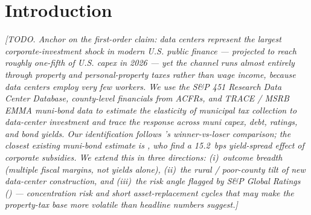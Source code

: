 \section{Introduction}\label{sec:intro}

\noindent\textit{[TODO. Anchor on the first-order claim: data centers represent the largest corporate-investment shock in modern U.S. public finance — projected to reach roughly one-fifth of U.S. capex in 2026 — yet the channel runs almost entirely through property and personal-property taxes rather than wage income, because data centers employ very few workers. We use the S\&P 451 Research Data Center Database, county-level financials from ACFRs, and TRACE / MSRB EMMA muni-bond data to estimate the elasticity of municipal tax collection to data-center investment and trace the response across muni capex, debt, ratings, and bond yields. Our identification follows \citet{greenstone2010_milliondollar}'s winner-vs-loser comparison; the closest existing muni-bond estimate is \citet{chava_subsidies}, who find a 15.2~bps yield-spread effect of corporate subsidies. We extend this in three directions: (i)~outcome breadth (multiple fiscal margins, not yields alone), (ii)~the rural / poor-county tilt of new data-center construction, and (iii)~the risk angle flagged by S\&P Global Ratings (\citeyear{spratings2026_everywhere}) — concentration risk and short asset-replacement cycles that may make the property-tax base more volatile than headline numbers suggest.]}

